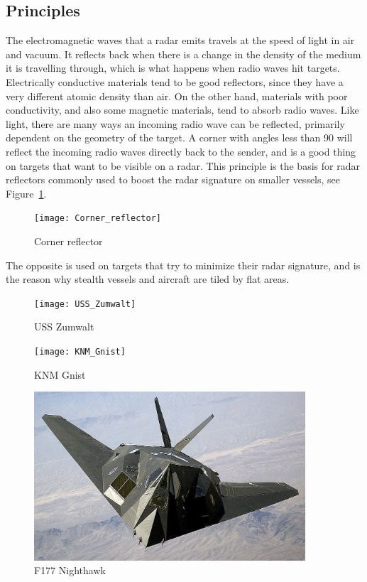 \subsection{Principles}
The electromagnetic waves that a radar emits travels at the speed of light in air and vacuum. It reflects back when there is a change in the density of the medium it is travelling through, which is what happens when radio waves hit targets. Electrically conductive materials tend to be good reflectors, since they have a very different atomic density than air. On the other hand, materials with poor conductivity, and also some magnetic materials, tend to absorb radio waves. Like light, there are many ways an incoming radio wave can be reflected, primarily dependent on the geometry of the target. A corner with angles less than 90\degsym{} will reflect the incoming radio waves directly back to the sender, and is a good thing on targets that want to be visible on a radar. This principle is the basis for radar reflectors commonly used to boost the radar signature on smaller vessels, see Figure~\ref{fig:corner_reflector}.
\begin{figure}
\centering
\texttt{[image: Corner\_reflector]}
\caption{Corner reflector}\label{fig:corner_reflector}
\end{figure}
The opposite is used on targets that try to minimize their radar signature, and is the reason why stealth vessels and aircraft are tiled by flat areas. 
\begin{figure}
\centering
\begin{minipage}{0.3\textwidth}
\texttt{[image: USS\_Zumwalt]}
\caption{USS Zumwalt}\label{fig:uss_zumwalt}
\end{minipage}\hfill
\begin{minipage}{0.3\textwidth}
\texttt{[image: KNM\_Gnist]}
\caption{KNM Gnist}\label{fig:knm_gnist}
\end{minipage}\hfill
\begin{minipage}{0.3\textwidth}
\includegraphics[width=0.9\textwidth]{Figures/F-117_Nighthawk}
\caption{F177 Nighthawk}\label{fig:f177_nighthawk}
\end{minipage}
\end{figure}

